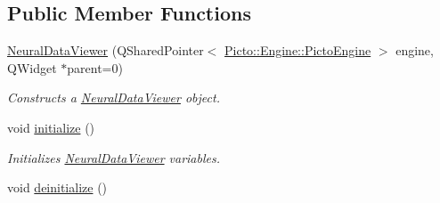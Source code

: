 \subsection*{Public Member Functions}
\begin{DoxyCompactItemize}
\item 
\hyperlink{class_neural_data_viewer_a2e9aa904728f717169190b383d779945}{Neural\-Data\-Viewer} (Q\-Shared\-Pointer$<$ \hyperlink{class_picto_1_1_engine_1_1_picto_engine}{Picto\-::\-Engine\-::\-Picto\-Engine} $>$ engine, Q\-Widget $\ast$parent=0)
\begin{DoxyCompactList}\small\item\em Constructs a \hyperlink{class_neural_data_viewer}{Neural\-Data\-Viewer} object. \end{DoxyCompactList}\item 
\hypertarget{class_neural_data_viewer_ad7a50c38547be5f6bbe9ef68b1622c30}{void \hyperlink{class_neural_data_viewer_ad7a50c38547be5f6bbe9ef68b1622c30}{initialize} ()}\label{class_neural_data_viewer_ad7a50c38547be5f6bbe9ef68b1622c30}

\begin{DoxyCompactList}\small\item\em Initializes \hyperlink{class_neural_data_viewer}{Neural\-Data\-Viewer} variables. \end{DoxyCompactList}\item 
\hypertarget{class_neural_data_viewer_a5c15d9ad0b15991124e03c9f6ad21fcf}{void \hyperlink{class_neural_data_viewer_a5c15d9ad0b15991124e03c9f6ad21fcf}{deinitialize} ()}\label{class_neural_data_viewer_a5c15d9ad0b15991124e03c9f6ad21fcf}


\end{DoxyCompactItemize}
